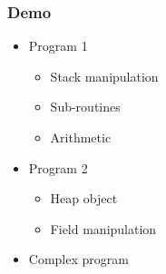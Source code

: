 \documentclass{beamer}
\begin{document}
\begin{frame}
  \frametitle{Demo}
  \begin{itemize}
  \item Program 1
    \begin{itemize}
    \item Stack manipulation
    \item Sub-routines
    \item Arithmetic
    \end{itemize}

  \item Program 2
    \begin{itemize}
    \item Heap object
    \item Field manipulation
    \end{itemize}

  \item Complex program
  \end{itemize}


\end{frame}
\end{document}
